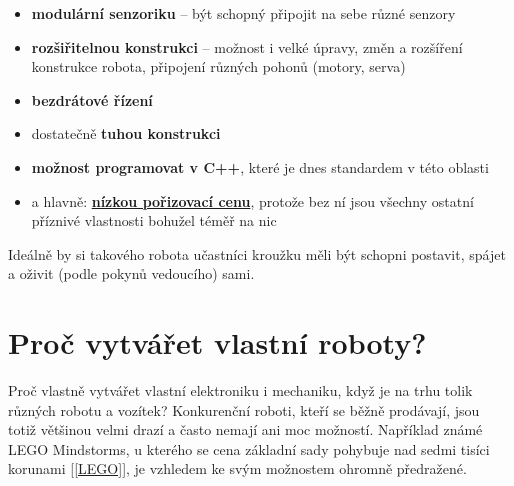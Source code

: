 \documentclass{template/socthesis}
\begin{document}
\begin{itemize}
	\item \textbf{modulární senzoriku} -- být schopný připojit na sebe různé senzory 
	
	\item \textbf{rozšiřitelnou konstrukci} -- možnost i velké úpravy, změn a rozšíření konstrukce robota, připojení různých pohonů (motory, serva)
	
	\item \textbf{bezdrátové řízení}
	
	\item dostatečně \textbf{tuhou konstrukci}
	
	\item  \textbf{možnost programovat v C++}, které je dnes standardem v této oblasti
	
	\item a hlavně: \underline{\textbf{nízkou pořizovací cenu}}, protože bez ní jsou všechny ostatní příznivé vlastnosti bohužel téměř na nic 
	
\end{itemize}

Ideálně by si takového robota učastníci kroužku měli být schopni postavit, spájet a oživit (podle pokynů vedoucího) sami. 





\newpage

\chapter{Proč vytvářet vlastní roboty?}

Proč vlastně vytvářet vlastní elektroniku i mechaniku, když je na trhu tolik různých robotu a vozítek? Konkurenční roboti, kteří se běžně prodávají, jsou totiž většinou velmi drazí a často nemají ani moc možností. Například známé LEGO Mindstorms, u kterého se cena základní sady pohybuje nad sedmi tisíci korunami [\ref{LEGO}],
 je vzhledem ke svým možnostem ohromně předražené.
 
\end{document}

